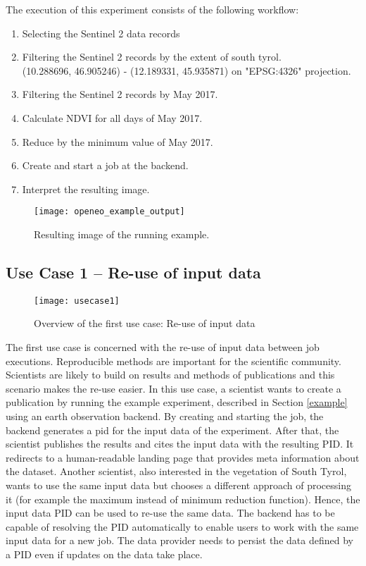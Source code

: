 \documentclass[draft,final]{vutinfth} %
\begin{document}
The execution of this experiment consists of the following workflow:

\begin{enumerate}
	\item Selecting the Sentinel 2 data records
	\item Filtering the Sentinel 2 records by the extent of south tyrol. \\(10.288696, 46.905246) - (12.189331, 45.935871) on "EPSG:4326" projection.
	\item Filtering the Sentinel 2 records by May 2017.
	\item Calculate NDVI for all days of May 2017.
	\item Reduce by the minimum value of May 2017.
	\item Create and start a job at the backend. 
	\item Interpret the resulting image.
\end{enumerate}

\begin{figure}[h]
	\centering
	\texttt{[image: openeo\_example\_output]}
	\caption{Resulting image of the running example.}
	\label{fig:example} %
\end{figure}

\newpage
\subsection{Use Case 1 – Re-use of input data}\label{UseCase1}
\begin{figure}[h]
	\centering
	\texttt{[image: usecase1]}
	\caption{Overview of the first use case: Re-use of input data}
	\label{fig:usecase1} %
\end{figure}
The first use case is concerned with the re-use of input data between job executions. Reproducible methods are important for the scientific community. Scientists are likely to build on results and methods of publications and this scenario makes the re-use easier. In this use case, a scientist wants to create a publication by running the example experiment, described in Section \ref{example} using an earth observation backend. By creating and starting the job, the backend generates a \gls{pid} for the input data of the experiment. After that, the scientist publishes the results and cites the input data with the resulting PID. It redirects to a human-readable landing page that provides meta information about the dataset. Another scientist, also interested in the vegetation of South Tyrol, wants to use the same input data but chooses a different approach of processing it (for example the maximum instead of minimum reduction function). Hence, the input data PID can be used to re-use the same data. The backend has to be capable of resolving the PID automatically to enable users to work with the same input data for a new job. The data provider needs to persist the data defined by a PID even if updates on the data take place.   
\end{document}
